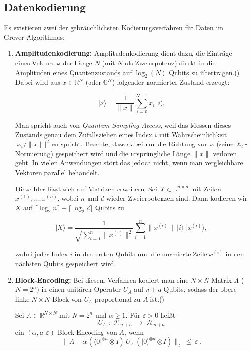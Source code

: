 \subsection{Datenkodierung}
Es existieren zwei der gebräuchlichsten Kodierungsverfahren für Daten im Grover-Algorithmus:  
\begin{enumerate}  
  \item \textbf{Amplitudenkodierung:}  
Amplitudenkodierung dient dazu, die Einträge eines Vektors $x$ der Länge $N$ (mit $N$ als Zweierpotenz) direkt in die Amplituden eines Quantenzustands auf $\log_2(N)$ Qubits zu übertragen.(\cite{alessandro_luongo_quantum_2024}) Dabei wird aus $x\in\mathbb{R}^N$ (oder $\mathbb{C}^N$) folgender normierter Zustand erzeugt:

$$
\lvert x\rangle
=\frac{1}{\|x\|}\sum_{i=0}^{N-1}x_i\,\lvert i\rangle.
$$

Man spricht auch von \textit{Quantum Sampling Access}, weil das Messen dieses Zustands genau dem Zufallsziehen eines Index $i$ mit Wahrscheinlichkeit $\lvert x_i/\|x\|\rvert^2$ entspricht. Beachte, dass dabei nur die Richtung von $x$ (seine $\ell_2$-Normierung) gespeichert wird und die ursprüngliche Länge $\|x\|$ verloren geht. In vielen Anwendungen stört das jedoch nicht, wenn man vergleichbare Vektoren parallel behandelt.

Diese Idee lässt sich auf Matrizen erweitern. Sei $X\in\mathbb{R}^{n\times d}$ mit Zeilen\\$x^{(1)},\dots,x^{(n)}$, wobei $n$ und $d$ wieder Zweierpotenzen sind. Dann kodieren wir $X$ auf $\lceil\log_2 n\rceil + \lceil\log_2 d\rceil$ Qubits zu

$$
\lvert X\rangle
=\frac{1}{\sqrt{\sum_{i=1}^n\|x^{(i)}\|^2}}
\sum_{i=1}^n\|x^{(i)}\|\;\lvert i\rangle\;\lvert x^{(i)}\rangle,
$$

wobei jeder Index $i$ in den ersten Qubits und die normierte Zeile $x^{(i)}$ in den nächsten Qubits gespeichert wird.\\

  \item \textbf{Block-Encoding:}  
    Bei diesem Verfahren kodiert man eine \(N\times N\)-Matrix \(A\) (\(N=2^n\)) in einen unitären Operator \(U_A\) auf \(n+a\) Qubits,  
    sodass der obere linke \(N\times N\)-Block von \(U_A\) proportional zu \(A\) ist.(\cite{alessandro_luongo_quantum_2024})

    \begin{definition}\label{def:block-encoding}  
    Sei \(A\in\mathbb{R}^{N\times N}\) mit \(N=2^n\) und \(\alpha\ge1\). Für \(\varepsilon>0\) heißt  
    \[
      U_A\;:\;\mathcal{H}_{n+a}\;\to\;\mathcal{H}_{n+a}
    \]  
    ein \((\alpha,a,\varepsilon)\)\nobreakdash-Block-Encoding von \(A\), wenn  
    \[
      \bigl\|A - \alpha\,(\langle0|^{\otimes a}\otimes I)\,U_A\,(|0\rangle^{\otimes a}\otimes I)\bigr\|_2 \;\le\;\varepsilon\,.  
    \]
    \end{definition}  


\end{enumerate}
